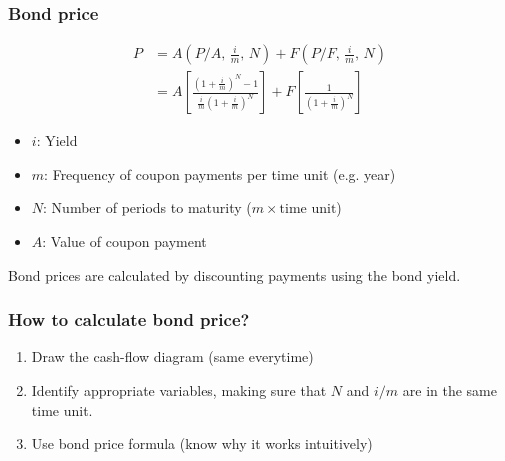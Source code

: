 \subsubsection{Bond price}
\begin{definition}
    \begin{equation}
        \begin{aligned}
            P &= A \left(P/A, \, \frac{i}{m}, \, N\right) + F \left(P/F, \, \frac{i}{m}, \, N\right) \\
            &= A \left[\frac{(1 + \frac{i}{m})^{N} - 1}{\frac{i}{m} (1 + \frac{i}{m})^{N}}\right] + F \left[\frac{1}{(1 + \frac{i}{m})^{N}}\right]
        \end{aligned}
    \end{equation}

    \begin{itemize}
        \item $i$: Yield
        \item $m$: Frequency of coupon payments per time unit (e.g. year)
        \item $N$: Number of periods to maturity ($m \times \text{time unit}$)
        \item $A$: Value of coupon payment
    \end{itemize}
\end{definition}

\begin{intuition}
    Bond prices are calculated by discounting payments using the bond yield.
\end{intuition}

\subsubsection{How to calculate bond price?}
\begin{process}
    \begin{enumerate}
        \item Draw the cash-flow diagram (same everytime)
        \item Identify appropriate variables, making sure that $N$ and $i/m$ are in the same time unit.
        \item Use bond price formula (know why it works intuitively)
    \end{enumerate}
\end{process}

